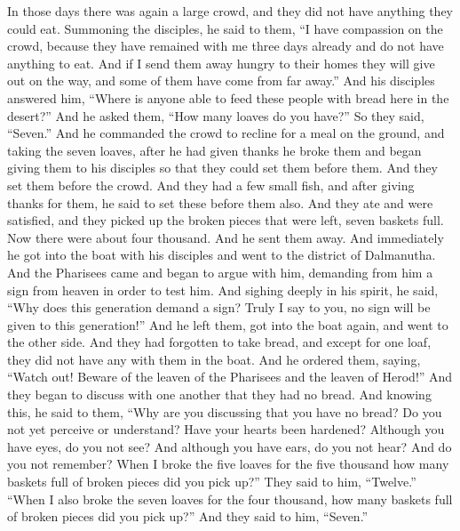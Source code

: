\begin{biblechapter} %
 In those days there was again a large crowd, and they did not have anything they could eat. Summoning the disciples, he said to them,
\verse “I have compassion on the crowd, because they have remained with me three days already and do not have anything to eat.
\verse And if I send them away hungry to their homes they will give out on the way, and some of them have come from far away.”
\verse And his disciples answered him, “Where is anyone able to feed these people with bread here in the desert?”
\verse And he asked them, “How many loaves do you have?” So they said, “Seven.”
\verse And he commanded the crowd to recline for a meal on the ground, and taking the seven loaves, after he had given thanks he broke them and began giving them to his disciples so that they could set them before them. And they set them before the crowd.
\verse And they had a few small fish, and after giving thanks for them, he said to set these before them also.
\verse And they ate and were satisfied, and they picked up the broken pieces that were left, seven baskets full.
\verse Now there were about four thousand. And he sent them away.
\verse And immediately he got into the boat with his disciples and went to the district of Dalmanutha.
 And the Pharisees came and began to argue with him, demanding from him a sign from heaven in order to test him.
\verse And sighing deeply in his spirit, he said, “Why does this generation demand a sign? Truly I say to you, no sign will be given to this generation!”
\verse And he left them, got into the boat again, and went to the other side.
 And they had forgotten to take bread, and except for one loaf, they did not have any with them in the boat.
\verse And he ordered them, saying, “Watch out! Beware of the leaven of the Pharisees and the leaven of Herod!”
\verse And they began to discuss with one another that they had no bread.
\verse And knowing this, he said to them, “Why are you discussing that you have no bread? Do you not yet perceive or understand? Have your hearts been hardened?
\verse Although you have eyes, do you not see? And although you have ears, do you not hear? And do you not remember?
\verse When I broke the five loaves for the five thousand how many baskets full of broken pieces did you pick up?” They said to him, “Twelve.”
\verse “When I also broke the seven loaves for the four thousand, how many baskets full of broken pieces did you pick up?” And they said to him, “Seven.”

\end{biblechapter}
